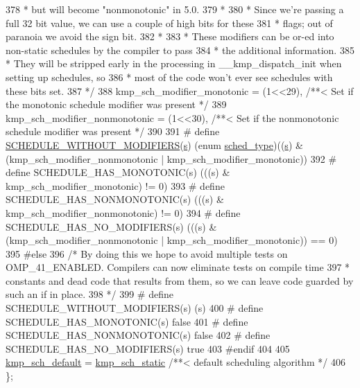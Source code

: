 \begin{DoxyCode}
378 \textcolor{comment}{     * but will become "nonmonotonic" in 5.0.}
379 \textcolor{comment}{     *}
380 \textcolor{comment}{     * Since we're passing a full 32 bit value, we can use a couple of high bits for these}
381 \textcolor{comment}{     * flags; out of paranoia we avoid the sign bit.}
382 \textcolor{comment}{     *}
383 \textcolor{comment}{     * These modifiers can be or-ed into non-static schedules by the compiler to pass}
384 \textcolor{comment}{     * the additional information.}
385 \textcolor{comment}{     * They will be stripped early in the processing in \_\_kmp\_dispatch\_init when setting up schedules, so}
386 \textcolor{comment}{     * most of the code won't ever see schedules with these bits set.}
387 \textcolor{comment}{     */}
388     kmp\_sch\_modifier\_monotonic      = (1<<29), \textcolor{comment}{/**< Set if the monotonic schedule modifier was present */}
389     kmp\_sch\_modifier\_nonmonotonic   = (1<<30), \textcolor{comment}{/**< Set if the nonmonotonic schedule modifier was present 
      */}
390 
391 # define \hyperlink{kmp_8h_a94668cc2f95d0cf3d02801dc645b8642}{SCHEDULE\_WITHOUT\_MODIFIERS}(\hyperlink{ittnotify__static_8h_a110bd9ede250f97ce56d81bb3c7b171d}{s}) (\textcolor{keyword}{enum} 
      \hyperlink{group__WORK__SHARING_gadcaf200537aaa0218a60c398438f81be}{sched\_type})((\hyperlink{ittnotify__static_8h_a110bd9ede250f97ce56d81bb3c7b171d}{s}) & ~ (kmp\_sch\_modifier\_nonmonotonic | kmp\_sch\_modifier\_monotonic))
392 \textcolor{preprocessor}{# define SCHEDULE\_HAS\_MONOTONIC(s)     (((s) & kmp\_sch\_modifier\_monotonic)    != 0)}
393 \textcolor{preprocessor}{}\textcolor{preprocessor}{# define SCHEDULE\_HAS\_NONMONOTONIC(s)  (((s) & kmp\_sch\_modifier\_nonmonotonic) != 0)}
394 \textcolor{preprocessor}{}\textcolor{preprocessor}{# define SCHEDULE\_HAS\_NO\_MODIFIERS(s)  (((s) & (kmp\_sch\_modifier\_nonmonotonic |
       kmp\_sch\_modifier\_monotonic)) == 0)}
395 \textcolor{preprocessor}{}\textcolor{preprocessor}{#else}
396 \textcolor{preprocessor}{}    \textcolor{comment}{/* By doing this we hope to avoid multiple tests on OMP\_41\_ENABLED. Compilers can now eliminate tests
       on compile time}
397 \textcolor{comment}{     * constants and dead code that results from them, so we can leave code guarded by such an if in place.}
398 \textcolor{comment}{     */}
399 \textcolor{preprocessor}{# define SCHEDULE\_WITHOUT\_MODIFIERS(s) (s)}
400 \textcolor{preprocessor}{}\textcolor{preprocessor}{# define SCHEDULE\_HAS\_MONOTONIC(s)     false}
401 \textcolor{preprocessor}{}\textcolor{preprocessor}{# define SCHEDULE\_HAS\_NONMONOTONIC(s)  false}
402 \textcolor{preprocessor}{}\textcolor{preprocessor}{# define SCHEDULE\_HAS\_NO\_MODIFIERS(s)  true}
403 \textcolor{preprocessor}{}\textcolor{preprocessor}{#endif}
404 \textcolor{preprocessor}{}
405     \hyperlink{group__WORK__SHARING_ggadcaf200537aaa0218a60c398438f81bea317dd63053ef79e3b3cea2ce2b676b38}{kmp\_sch\_default} = \hyperlink{group__WORK__SHARING_ggadcaf200537aaa0218a60c398438f81bea2a987351b9605b918693a17d4dd90772}{kmp\_sch\_static}  \textcolor{comment}{/**< default scheduling algorithm */}
406 \};
\end{DoxyCode}


